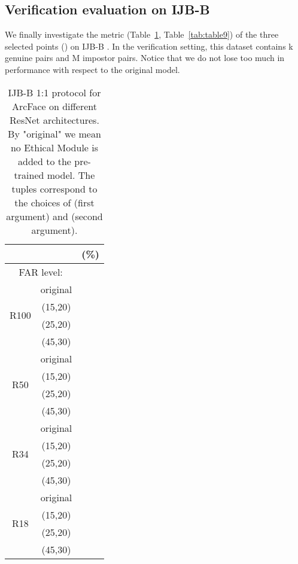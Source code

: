 \documentclass[nohyperref]{article}
\theoremstyle{plain}
\theoremstyle{definition}
\theoremstyle{remark}
\begin{document}
\subsection{Verification evaluation on IJB-B}

We finally investigate the  metric (Table~\ref{tab:table8}, Table~\ref{tab:table9}) of the three selected points () on IJB-B \cite{whitelam2017iarpa}. In the verification setting, this dataset contains k genuine pairs and M impostor pairs. Notice that we do not lose too much in performance with respect to the original model.






\begin{table}
\centering
\caption{IJB-B 1:1 protocol for ArcFace on different ResNet architectures. By "original" we mean no Ethical Module is added to the pre-trained model. The tuples correspond to the choices of  (first argument) and  (second argument).}
\begin{tabular}{ c | c | c | c}

 & & \multicolumn{2}{c}{ (\%)} \\ \hline \hline
 \multicolumn{2}{c}{ FAR level: }         &  &  \\  
 \hline \hline
                              & original  &  &   \\
  \multirow{2}{*}{R100}       & (15,20) &  &   \\
                              & (25,20) &  &   \\
                              & (45,30) &  &   \\ \hline     
                              & original  &  &   \\
  \multirow{2}{*}{R50}        & (15,20) &  &   \\
                              & (25,20) &  &   \\
                              & (45,30) &  &   \\ \hline 
                              & original  &  &   \\
\multirow{2}{*}{R34}          & (15,20) &  &   \\
                              & (25,20) &  &   \\
                              & (45,30) &  &   \\ \hline 
                              & original  &  &   \\
  \multirow{2}{*}{R18}        & (15,20) & &   \\
                              & (25,20) & &  \\
                              & (45,30) &  &   \\ \hline 
\end{tabular}
\label{tab:table8}
\end{table}
\end{document}
